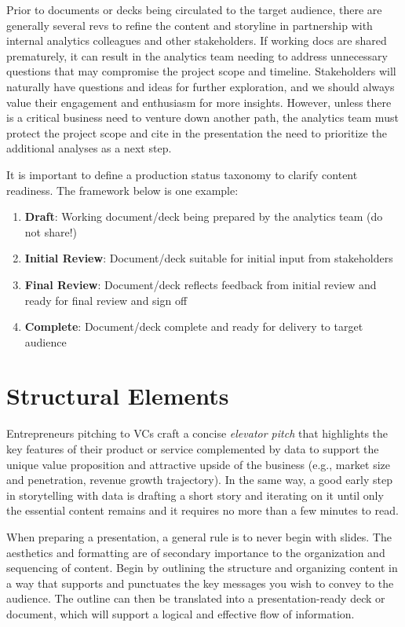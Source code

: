\documentclass[
]{book}
\providecommand{\tightlist}{%
  \setlength{\itemsep}{0pt}\setlength{\parskip}{0pt}}
\begin{document}
Prior to documents or decks being circulated to the target audience, there are generally several revs to refine the content and storyline in partnership with internal analytics colleagues and other stakeholders. If working docs are shared prematurely, it can result in the analytics team needing to address unnecessary questions that may compromise the project scope and timeline. Stakeholders will naturally have questions and ideas for further exploration, and we should always value their engagement and enthusiasm for more insights. However, unless there is a critical business need to venture down another path, the analytics team must protect the project scope and cite in the presentation the need to prioritize the additional analyses as a next step.

It is important to define a production status taxonomy to clarify content readiness. The framework below is one example:

\begin{enumerate}
\def\labelenumi{\arabic{enumi}.}
\tightlist
\item
  \textbf{Draft}: Working document/deck being prepared by the analytics team (do not share!)
\item
  \textbf{Initial Review}: Document/deck suitable for initial input from stakeholders
\item
  \textbf{Final Review}: Document/deck reflects feedback from initial review and ready for final review and sign off
\item
  \textbf{Complete}: Document/deck complete and ready for delivery to target audience
\end{enumerate}

\hypertarget{structural-elements}{%
\section{Structural Elements}\label{structural-elements}}

Entrepreneurs pitching to VCs craft a concise \emph{elevator pitch} that highlights the key features of their product or service complemented by data to support the unique value proposition and attractive upside of the business (e.g., market size and penetration, revenue growth trajectory). In the same way, a good early step in storytelling with data is drafting a short story and iterating on it until only the essential content remains and it requires no more than a few minutes to read.

When preparing a presentation, a general rule is to never begin with slides. The aesthetics and formatting are of secondary importance to the organization and sequencing of content. Begin by outlining the structure and organizing content in a way that supports and punctuates the key messages you wish to convey to the audience. The outline can then be translated into a presentation-ready deck or document, which will support a logical and effective flow of information.
\end{document}
